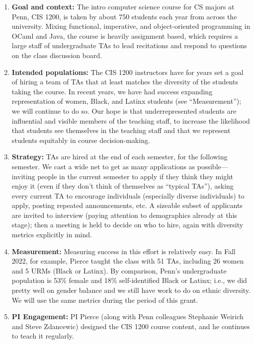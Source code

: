 \begin{enumerate}
\item {\bf Goal and context:} The intro computer science course for CS
majors at Penn, CIS 1200, is taken by about 750 students each year
from across the university.  Mixing functional, imperative, and
object-oriented programming in OCaml and Java, the course is heavily
assignment based, which requires a large staff of undergraduate TAs to
lead recitations and respond to questions on the class discussion
board.

\item {\bf Intended populations:} The CIS 1200 instructors have for years
set a goal of hiring a team of TAs that at least matches the diversity of the
students taking the course. In recent years, we have had success expanding
representation of women, Black, and Latinx students (see ``Measurement''); we
will continue to do so. Our hope is that underrepresented students are
influential and visible members of the teaching staff, to increase the
likelihood that students see themselves in the teaching staff and that we
represent students equitably in course decision-making.  

\item {\bf Strategy:} TAs are hired at the end of each semester, for
the following semester.  We cast a wide net to get as many
applications as possible---inviting people in the current semester to
apply if they think they might enjoy it (even if they don't think of
themselves as ``typical TAs''), asking every current TA to encourage
individuals (especially diverse individuals) to apply, posting
repeated announcements, etc.  A sizeable subset of applicants are
invited to interview (paying attention to demographics already at this
stage); then a meeting is held to decide on who to hire, again with
diversity metrics explicitly in mind.

\item {\bf Measurement:} Measuring success in this effort is
relatively easy.  In Fall 2022, for example, Pierce taught the class
with 51 TAs, including 26 women and 5 URMs (Black or Latinx).  By
comparison, Penn's undergraduate population is 53\% female and 18\%
self-identified Black or Latinx; i.e., we did pretty well on gender balance
and we still have work to do on ethnic diversity.  We will use the
same metrics during the period of this grant.

\item {\bf PI Engagement:} PI Pierce (along with Penn colleagues
Stephanie Weirich and Steve Zdancewic) designed the CIS 1200 course
content, and he continues to teach it regularly.
\end{enumerate}

